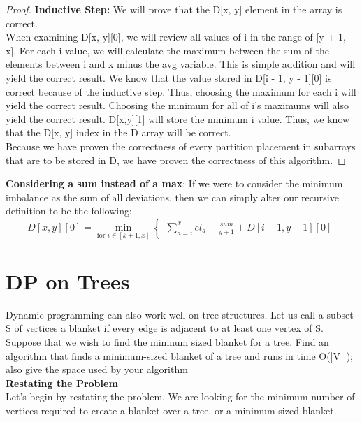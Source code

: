 \documentclass[11pt, solution, letterpaper]{format}
\begin{document}
\begin{proof}
\textbf{Inductive Step:} We will prove that the D[x, y] element in the array is correct. \\

When examining D[x, y][0], we will review all values of i in the range of [y + 1, x]. For each i value, we will calculate the maximum between the sum of the elements between i and x minus the avg variable. This is simple addition and will yield the correct result. We know that the value stored in D[i - 1, y - 1][0] is correct because of the inductive step. Thus, choosing the maximum for each i will yield the correct result. Choosing the minimum for all of i's maximums will also yield the correct result. D[x,y][1] will store the minimum i value. Thus, we know that the D[x, y] index in the D array will be correct.\\

Because we have proven the correctness of every partition placement in subarrays that are to be stored in D, we have proven the correctness of this algorithm.\end{proof}

\textbf{Considering a sum instead of a max}:
If we were to consider the minimum imbalance as the sum of all deviations, then we can simply alter our recursive definition to be the following:
 \[
  D[x, y][0] = \min_{\text{for } i \in [k + 1, x]} 
  \begin{cases}
                                  
                    \sum_{a=i}^{x} el_a -  \frac{sum}{y + 1}          +D[i - 1, y - 1][0]

  \end{cases}
\]


\clearpage
\section{DP on Trees}
Dynamic programming can also work well on tree structures. Let us call a subset S of vertices a blanket if every
edge is adjacent to at least one vertex of S. Suppose that we wish to find the mininum sized blanket for a tree. Find
an algorithm that finds a minimum-sized blanket of a tree and runs in time O(|V |); also give the space used by your
algorithm\\

\textbf{Restating the Problem}\\
Let's begin by restating the problem. We are looking for the minimum number of vertices required to create a blanket over a tree, or a minimum-sized blanket.\\
\end{document}
